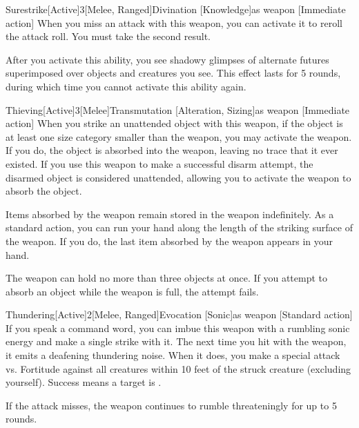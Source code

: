 \begin{magicitemdef}{Surestrike}[Active]{3}[Melee, Ranged]{Divination [Knowledge]}{as weapon}
    [Immediate action] When you miss an attack with this weapon, you can activate it to reroll the attack roll.
    You must take the second result.

    After you activate this ability, you see shadowy glimpses of alternate futures superimposed over objects and creatures you see.
    This effect lasts for 5 rounds, during which time you cannot activate this ability again.
\end{magicitemdef}

\begin{magicitemdef}{Thieving}[Active]{3}[Melee]{Transmutation [Alteration, Sizing]}{as weapon}
    [Immediate action] When you strike an unattended object with this weapon, if the object is at least one size category smaller than the weapon, you may activate the weapon.
    If you do, the object is absorbed into the weapon, leaving no trace that it ever existed.
    If you use this weapon to make a successful disarm attempt, the disarmed object is considered unattended, allowing you to activate the weapon to absorb the object.

     Items absorbed by the weapon remain stored in the weapon indefinitely.
    As a standard action, you can run your hand along the length of the striking surface of the weapon.
    If you do, the last item absorbed by the weapon appears in your hand.

    The weapon can hold no more than three objects at once.
    If you attempt to absorb an object while the weapon is full, the attempt fails.
\end{magicitemdef}

\begin{magicitemdef}{Thundering}[Active]{2}[Melee, Ranged]{Evocation [Sonic]}{as weapon}
    [Standard action] If you speak a command word, you can imbue this weapon with a rumbling sonic energy and make a single strike with it.
    The next time you hit with the weapon, it emits a deafening thundering noise.
    When it does, you make a special attack vs. Fortitude against all creatures within 10 feet of the struck creature (excluding yourself).
    Success means a target is \deafened.

    If the attack misses, the weapon continues to rumble threateningly for up to 5 rounds.
\end{magicitemdef}

